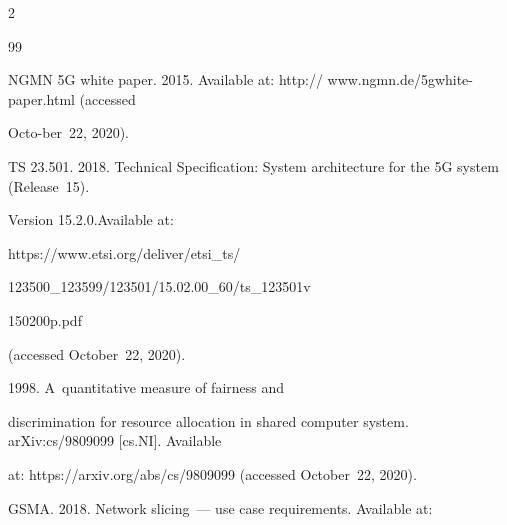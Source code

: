   \begin{multicols}{2}





\renewcommand{\bibname}{\protect\rmfamily References}







{\small\frenchspacing


 {%




 \begin{thebibliography}{99}







NGMN 5G white paper. 2015. Available at: {\sf http:// www.ngmn.de/5gwhite-paper.html} (accessed 


Octo-\linebreak ber~22, 2020).




TS 23.501. 2018. Technical Specification: System architecture for the 5G system (Release~15).


Version 15.2.0.\linebreak Available at: {\sf 


https://www.etsi.org/deliver/etsi\_ts/\linebreak


 123500\_123599/123501/15.02.00\_60/ts\_123501v


 150200p.pdf} 


(accessed October~22, 2020).







 1998. A~quantitative measure of fairness and 


discrimination for resource allocation in shared computer system. arXiv:cs/9809099 [cs.NI]. Available 


at: {\sf https://arxiv.org/abs/cs/9809099} (accessed October~22, 2020).










GSMA. 2018. Network slicing~--- use case requirements.  Available at: {\sf  


}
\end{thebibliography}}}
\end{multicols}

